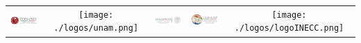 \begin{titlepage}
\begin{center}



	



	\begin{table}[h!]
	\centering
			\begin{tabular}{ccccc}




				\includegraphics[width=3cm]{./logos/conabio.png} &
				\texttt{[image: ./logos/unam.png]} &
				\includegraphics[width=3cm]{./logos/semarnat.png} &
				\includegraphics[width=3cm]{./logos/conanp.png} &
				\texttt{[image: ./logos/logoINECC.png]} \\


\end{tabular}
\end{table}
\end{center}
\end{titlepage}
